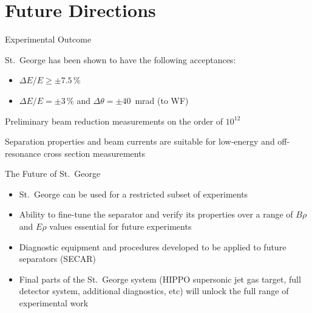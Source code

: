 \documentclass[10pt]{beamer}
\begin{document}
\section{Future Directions}

\begin{frame}[fragile]{Experimental Outcome}

    St.\ George has been shown to have the following acceptances:
    \begin{itemize}
        \item $\Delta E/E \geq \pm 7.5$\,\%
        \item $\Delta E/E = \pm 3$\,\% and $\Delta\theta = \pm 40$~mrad
            (to WF)
    \end{itemize}

    Preliminary beam reduction measurements on the order of $10^{12}$

    Separation properties and beam currents are suitable for low-energy
    and off-resonance cross section measurements

\end{frame}

\begin{frame}[fragile]{The Future of St.\ George}

    \begin{itemize}
        \item St.\ George can be used for a restricted subset of
            experiments
        \item Ability to fine-tune the separator and verify its
            properties over a range of $B\rho$ and $E\rho$ values
            essential for future experiments
        \item Diagnostic equipment and procedures developed to be
            applied to future separators (SECAR)
        \item Final parts of the St.\ George system (HIPPO supersonic
            jet gas target, full detector system, additional
            diagnostics, etc) will unlock the full range of experimental
            work
    \end{itemize}

\end{frame}

\maketitle

\appendix

\end{document}
